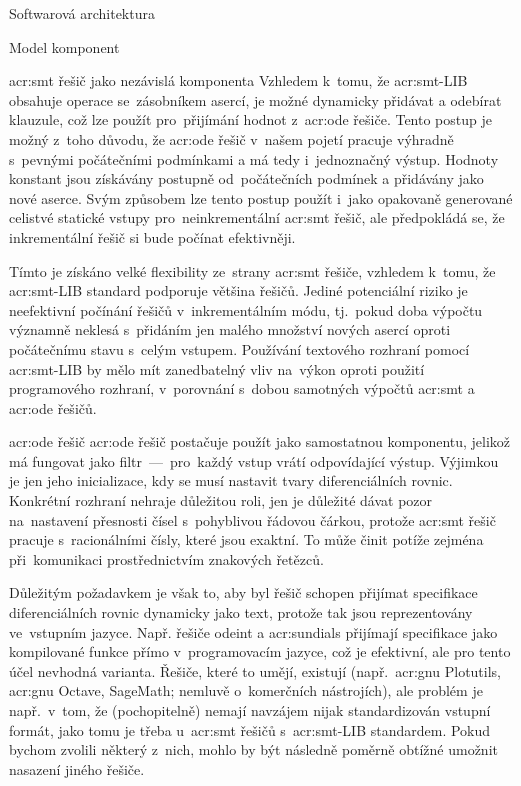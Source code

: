 \documentclass[thesis=M,czech]{FITthesis}[2012/06/26]
\newcommand{\acrlabel}[1]{acr:#1}
\newcommand{\acr}[1]{\acrshort{\acrlabel{#1}}}
\begin{document}
\begin{section}{Softwarová architektura}
\begin{subsection}{Model komponent}
\begin{subsubsection}{\acr{smt} řešič jako nezávislá komponenta}
Vzhledem k~tomu, že \acr{smt}-LIB
obsahuje operace se~zásobníkem asercí,
je možné dynamicky přidávat a odebírat
klauzule, což lze použít
pro~přijímání hodnot z~\acr{ode} řešiče.
Tento postup je možný z~toho důvodu,
že \acr{ode} řešič v~našem pojetí
pracuje výhradně s~pevnými počátečními podmínkami
a má tedy i~jednoznačný výstup.
Hodnoty konstant jsou získávány postupně
od~počátečních podmínek a přidávány jako nové aserce.
Svým způsobem lze tento postup použít
i~jako opakovaně generované celistvé statické vstupy
pro~neinkrementální \acr{smt} řešič,
ale předpokládá se, že inkrementální řešič
si bude počínat efektivněji.

Tímto je získáno velké flexibility
ze~strany \acr{smt} řešiče,
vzhledem k~tomu, že \acr{smt}-LIB standard
podporuje většina řešičů.
Jediné potenciální riziko
je neefektivní počínání řešičů
v~inkrementálním módu,
tj.~pokud doba výpočtu
významně neklesá s~přidáním jen malého množství
nových asercí oproti počátečnímu stavu s~celým vstupem.
Používání textového rozhraní pomocí \acr{smt}-LIB
by mělo mít zanedbatelný vliv na~výkon
oproti použití programového rozhraní,
v~porovnání s~dobou samotných výpočtů
\acr{smt} a \acr{ode} řešičů.
\end{subsubsection} %


\begin{subsubsection}{\acr{ode} řešič}\label{sss:design:arch:comp:ode}
\acr{ode} řešič postačuje použít jako samostatnou komponentu,
jelikož má fungovat jako
filtr~---~pro~každý vstup vrátí odpovídající výstup.
Výjimkou je jen jeho inicializace,
kdy se musí nastavit tvary diferenciálních rovnic.
Konkrétní rozhraní nehraje důležitou roli,
jen je důležité dávat pozor na~nastavení přesnosti
čísel s~pohyblivou řádovou čárkou,
protože \acr{smt} řešič pracuje s~racionálními čísly,
které jsou exaktní. To může činit potíže zejména
při~komunikaci prostřednictvím znakových řetězců.

Důležitým požadavkem je však to,
aby byl řešič schopen přijímat
specifikace diferenciálních rovnic
dynamicky jako text,
protože tak jsou reprezentovány ve~vstupním jazyce.
Např. řešiče odeint a \acr{sundials}
přijímají specifikace jako kompilované funkce
přímo v~programovacím jazyce,
což je efektivní, ale pro tento účel
nevhodná varianta.
Řešiče, které to umějí, existují
(např.~\acr{gnu} Plotutils,
\acr{gnu} Octave, SageMath;
nemluvě o~komerčních nástrojích),
ale problém je např.~v~tom,
že (pochopitelně) nemají navzájem
nijak standardizován vstupní formát,
jako tomu je třeba u~\acr{smt} řešičů
s~\acr{smt}-LIB standardem.
Pokud bychom zvolili některý z~nich,
mohlo by být následně poměrně obtížné umožnit
nasazení jiného řešiče.


\end{subsubsection}
\end{subsection}
\end{section}
\end{document}
